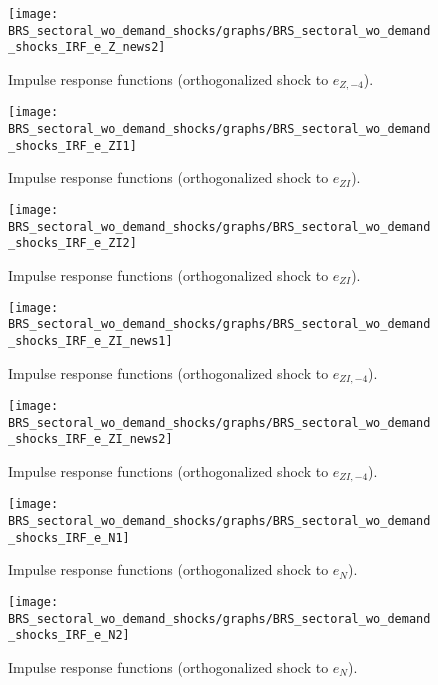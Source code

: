 \begin{figure}[H]
\centering 
\texttt{[image: BRS\_sectoral\_wo\_demand\_shocks/graphs/BRS\_sectoral\_wo\_demand\_shocks\_IRF\_e\_Z\_news2]}
\caption{Impulse response functions (orthogonalized shock to ${e_{Z,-4}}$).}\label{Fig:IRF:e_Z_news:2}
\end{figure}
 
\begin{figure}[H]
\centering 
\texttt{[image: BRS\_sectoral\_wo\_demand\_shocks/graphs/BRS\_sectoral\_wo\_demand\_shocks\_IRF\_e\_ZI1]}
\caption{Impulse response functions (orthogonalized shock to ${e_{ZI}}$).}\label{Fig:IRF:e_ZI:1}
\end{figure}
 
\begin{figure}[H]
\centering 
\texttt{[image: BRS\_sectoral\_wo\_demand\_shocks/graphs/BRS\_sectoral\_wo\_demand\_shocks\_IRF\_e\_ZI2]}
\caption{Impulse response functions (orthogonalized shock to ${e_{ZI}}$).}\label{Fig:IRF:e_ZI:2}
\end{figure}
 
\begin{figure}[H]
\centering 
\texttt{[image: BRS\_sectoral\_wo\_demand\_shocks/graphs/BRS\_sectoral\_wo\_demand\_shocks\_IRF\_e\_ZI\_news1]}
\caption{Impulse response functions (orthogonalized shock to ${e_{ZI,-4}}$).}\label{Fig:IRF:e_ZI_news:1}
\end{figure}
 
\begin{figure}[H]
\centering 
\texttt{[image: BRS\_sectoral\_wo\_demand\_shocks/graphs/BRS\_sectoral\_wo\_demand\_shocks\_IRF\_e\_ZI\_news2]}
\caption{Impulse response functions (orthogonalized shock to ${e_{ZI,-4}}$).}\label{Fig:IRF:e_ZI_news:2}
\end{figure}
 
\begin{figure}[H]
\centering 
\texttt{[image: BRS\_sectoral\_wo\_demand\_shocks/graphs/BRS\_sectoral\_wo\_demand\_shocks\_IRF\_e\_N1]}
\caption{Impulse response functions (orthogonalized shock to ${e_N}$).}\label{Fig:IRF:e_N:1}
\end{figure}
 
\begin{figure}[H]
\centering 
\texttt{[image: BRS\_sectoral\_wo\_demand\_shocks/graphs/BRS\_sectoral\_wo\_demand\_shocks\_IRF\_e\_N2]}
\caption{Impulse response functions (orthogonalized shock to ${e_N}$).}\label{Fig:IRF:e_N:2}
\end{figure}
 
